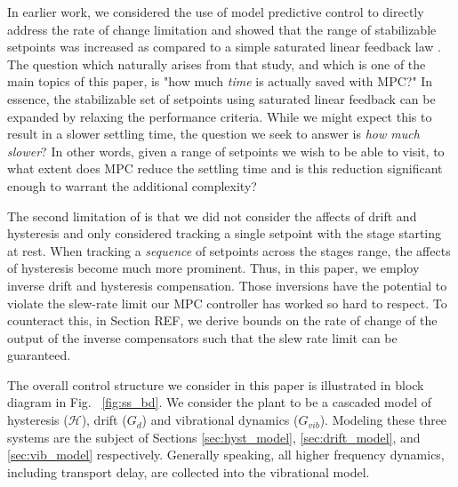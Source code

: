 \documentclass[journal,twocolumn,twoside]{IEEEtran}
\begin{document}
In earlier work, we considered the use of model predictive control to directly address the rate of change limitation and showed that the range of stabilizable setpoints was increased as compared to a simple saturated linear feedback law \cite{braker_application_2017}. The question which naturally arises from that study, and which is one of the main topics of this paper, is "how much \emph{time} is actually saved with MPC?" In essence, the stabilizable set of setpoints using saturated linear feedback can be expanded by relaxing the performance criteria. While we might expect this to result in a slower settling time, the question we seek to answer is \emph{how much slower}? In other words, given a range of setpoints we wish to be able to visit, to what extent does MPC reduce the settling time and is this reduction significant enough to warrant the additional complexity?

The second limitation of \cite{braker_application_2017} is that we did not consider the affects of drift and hysteresis and only considered tracking a single setpoint with the stage starting at rest. When tracking a \emph{sequence} of setpoints across the stages range, the affects of hysteresis become much more prominent. Thus, in this paper, we employ inverse drift and hysteresis compensation. Those inversions have the potential to violate the slew-rate limit our MPC controller has worked so hard to respect. To counteract this, in Section REF, we derive bounds on the rate of change of the output of the inverse compensators such that the slew rate limit can be guaranteed.


The overall control structure we consider in this paper is illustrated in block diagram in Fig. ~\ref{fig:ss_bd}. We consider the plant to be a cascaded model of hysteresis ($\mathcal{H}$),  drift ($G_d$) and vibrational dynamics ($G_{vib}$). Modeling these three systems are the subject of Sections \ref{sec:hyst_model}, \ref{sec:drift_model}, and \ref{sec:vib_model} respectively. Generally speaking, all higher frequency dynamics, including transport delay, are collected into the vibrational model.
\end{document}

